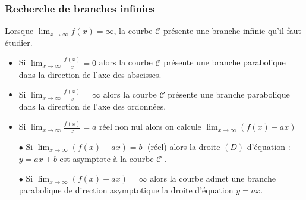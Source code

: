 \subsubsection{Recherche de branches infinies}
Lorsque  $\displaystyle \lim_{x \to \infty}f(x)=\infty  $, la courbe $ \mathcal{C} $ présente une branche infinie qu'il faut étudier.
\begin{itemize}
\item    Si $\displaystyle \lim_{x \to \infty}\frac{f(x)}{x}=0  $  alors la courbe $ \mathcal{C} $ présente une branche parabolique dans la direction  de  l'axe des abscisses.

\item    Si $\displaystyle \lim_{x \to \infty}\frac{f(x)}{x}=\infty$  alors la courbe $ \mathcal{C} $ présente une branche parabolique dans la direction  de  l'axe des ordonnées.
\item  Si  $\displaystyle\lim_{x \to \infty}\frac{f(x)}{x}=a  $  réel  non nul alors on calcule $\displaystyle\lim_{x \to \infty}(f(x)-ax )  $ 

 $ \bullet $ Si  $\displaystyle \lim_{x \to \infty}(f(x)-ax) = b \; $  (réel) alors la droite $(D)$ d'équation : $y = a x  + b $ est asymptote à la courbe $ \mathcal{C} $ .

 $ \bullet $ Si $\displaystyle \lim_{x \to \infty}(f(x)-ax) = \infty $     alors la courbe admet une branche parabolique de direction asymptotique la droite d'équation $ y =  a x $.
\end{itemize}


